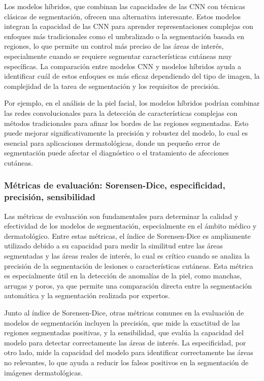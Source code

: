 Los modelos híbridos, que combinan las capacidades de las CNN con técnicas clásicas de segmentación, ofrecen una alternativa interesante. Estos modelos integran la capacidad de las CNN para aprender representaciones complejas con enfoques más tradicionales como el umbralizado o la segmentación basada en regiones, lo que permite un control más preciso de las áreas de interés, especialmente cuando se requiere segmentar características cutáneas muy específicas. La comparación entre modelos CNN y modelos híbridos ayuda a identificar cuál de estos enfoques es más eficaz dependiendo del tipo de imagen, la complejidad de la tarea de segmentación y los requisitos de precisión.

Por ejemplo, en el análisis de la piel facial, los modelos híbridos podrían combinar las redes convolucionales para la detección de características complejas con métodos tradicionales para afinar los bordes de las regiones segmentadas. Esto puede mejorar significativamente la precisión y robustez del modelo, lo cual es esencial para aplicaciones dermatológicas, donde un pequeño error de segmentación puede afectar el diagnóstico o el tratamiento de afecciones cutáneas.

\cite{hussain2021}

\subsubsection{Métricas de evaluación: Sorensen-Dice, especificidad, precisión, sensibilidad}
Las métricas de evaluación son fundamentales para determinar la calidad y efectividad de los modelos de segmentación, especialmente en el ámbito médico y dermatológico. Entre estas métricas, el índice de Sorensen-Dice es ampliamente utilizado debido a su capacidad para medir la similitud entre las áreas segmentadas y las áreas reales de interés, lo cual es crítico cuando se analiza la precisión de la segmentación de lesiones o características cutáneas. Esta métrica es especialmente útil en la detección de anomalías de la piel, como manchas, arrugas y poros, ya que permite una comparación directa entre la segmentación automática y la segmentación realizada por expertos.

Junto al índice de Sorensen-Dice, otras métricas comunes en la evaluación de modelos de segmentación incluyen la precisión, que mide la exactitud de las regiones segmentadas positivas, y la sensibilidad, que evalúa la capacidad del modelo para detectar correctamente las áreas de interés. La especificidad, por otro lado, mide la capacidad del modelo para identificar correctamente las áreas no relevantes, lo que ayuda a reducir los falsos positivos en la segmentación de imágenes dermatológicas.

